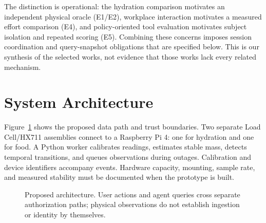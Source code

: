 \documentclass[conference]{IEEEtran}
\providecommand{\DIFadd}[1]{{\protect\color{blue} \sf #1}} %
\providecommand{\DIFaddbegin}{} %
\providecommand{\DIFaddend}{} %
\begin{document}
\DIFaddbegin \DIFadd{The distinction is operational: the hydration comparison motivates an independent physical oracle (E1/E2), workplace interaction motivates a measured effort comparison (E4), and policy-oriented tool evaluation motivates subject isolation and repeated scoring (E5). Combining these concerns imposes session coordination and query-snapshot obligations that are specified below. This is our synthesis of the selected works, not evidence that those works lack every related mechanism.
}

\DIFaddend \section{System Architecture}\label{sec:architecture}
Figure~\ref{fig:architecture} shows the proposed data path and trust boundaries. Two separate Load Cell/HX711 assemblies connect to a Raspberry Pi 4: one for hydration and one for food. A Python worker calibrates readings, estimates stable mass, detects temporal transitions, and queues observations during outages. Calibration and device identifiers accompany events. Hardware capacity, mounting, sample rate, and measured stability must be documented when the prototype is built.

\begin{figure}[t]
\centering
{}
\caption{Proposed architecture. User actions and agent queries cross separate authorization paths; physical observations do not establish ingestion or identity by themselves.}\label{fig:architecture}
\end{figure}
\end{document}
